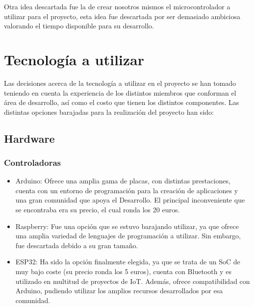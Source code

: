 \documentclass[runningheads]{llncs}
\begin{document}
Otra idea descartada fue la de crear nosotros mismos el microcontrolador a utilizar para el proyecto, esta idea fue descartada por ser demasiado ambiciosa valorando el tiempo disponible para su desarrollo.

\section{Tecnología a utilizar}
Las decisiones acerca de la tecnología a utilizar en el proyecto se han tomado teniendo en cuenta la experiencia de los distintos miembros que conforman el área de desarrollo, así como el costo que tienen los distintos componentes.
\newline
Las distintas opciones barajadas para la realización del proyecto han sido:

\subsection*{Hardware}
\subsubsection*{Controladoras}
\begin{itemize}
    \item Arduino: Ofrece una amplia gama de placas, con distintas prestaciones, cuenta con un entorno de programación para la creación de aplicaciones y una gran comunidad que apoya el Desarrollo. El principal inconveniente que se encontraba era su precio, el cual ronda los 20 euros.
    
    \item Raspberry: Fue una opción que se estuvo barajando utilizar, ya que ofrece una amplia variedad de lenguajes de programación a utilizar. Sin embargo, fue descartada debido a su gran tamaño.
    
    \item ESP32: Ha sido la opción finalmente elegida, ya que se trata de un SoC de muy bajo coste (su precio ronda los 5 euros), cuenta con Bluetooth y es utilizado en multitud de proyectos de IoT. Además, ofrece compatibilidad con Arduino, pudiendo utilizar los amplios recursos desarrollados por esa comunidad.
\end{itemize}
\end{document}
